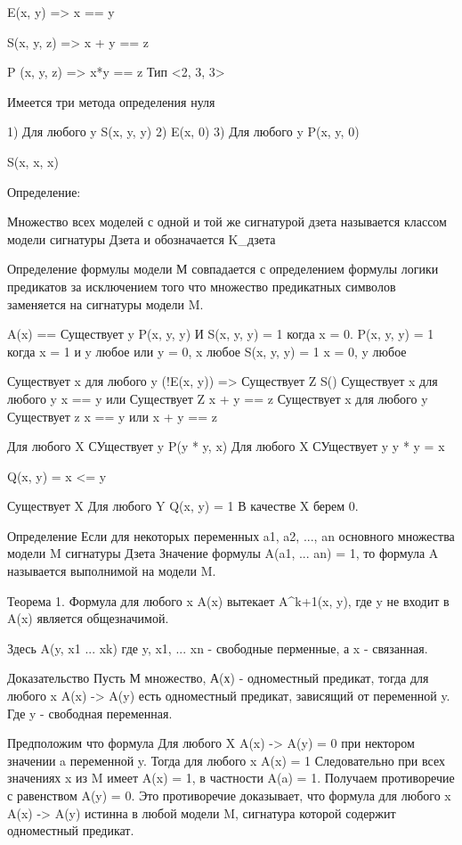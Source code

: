 E(x, y) => x == y

S(x, y, z) => x + y == z

P (x, y, z) => x*y == z
 Тип <2, 3, 3>

 Имеется три метода определения нуля

 1) Для любого y S(x, y, y)
 2) E(x, 0)
 3) Для любого y P(x, y, 0)

 S(x, x, x)

 Определение:

 Множество всех моделей с одной и той же сигнатурой дзета называется классом модели сигнатуры Дзета и обозначается K_{дзета}

 Определение формулы модели М совпадается с определением формулы логики предикатов за исключением того что множество предикатных символов заменяется на сигнатуры модели M.

 A(x) == Существует y P(x, y, y) И S(x, y, y)
 = 1 когда x = 0.
 P(x, y, y) = 1 { когда x = 1 и y любое } или {y = 0, x любое}
 S(x, y, y) = 1 { x = 0, y любое }

 Существует x для любого y (!E(x, y)) => Существует Z S()
 Существует x для любого y x == y или Существует Z x + y == z
 Существует x для любого y Существует z x == y или x + y == z


 Для любого X СУществует y P(y * y, x)
 Для любого X СУществует y y * y = x

 Q(x, y) = x <= y

 Существует X Для любого Y Q(x, y) = 1 В качестве X берем 0.

 Определение
 Если для некоторых переменных a1, a2, ..., an основного множества модели M сигнатуры Дзета
 Значение формулы A(a1, ... an) = 1, то формула A называется выполнимой на модели M.

 Теорема 1. Формула для любого x A(x)
 вытекает A^k+1(x, y), где y не входит в A(x) является общезначимой.

 Здесь A(y, x1 ... xk) где y, x1, ... xn - свободные перменные, а x - связанная.

 Доказательство
 Пусть М множество, А(х) - одноместный предикат, тогда для любого x A(x) -> A(y) есть одноместный предикат, зависящий от переменной y.
 Где y - свободная переменная.

 Предположим что формула Для любого X A(x) -> A(y) = 0 при нектором значении a переменной y.
 Тогда для любого x A(x) = 1
 Следовательно при всех значениях x из M имеет A(x) = 1, в частности A(a) = 1. Получаем противоречие с равенством A(y) = 0.
 Это противоречие доказывает, что формула для любого x A(x) -> A(y) истинна в любой модели M, сигнатура которой содержит одноместный предикат.


